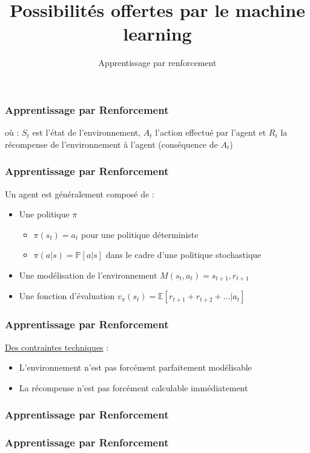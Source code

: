 \documentclass{formation}
\title{Possibilités offertes par le machine learning}
\subtitle{Apprentissage par renforcement}
\begin{document}
\maketitle

\begin{frame}
  \frametitle{Apprentissage par Renforcement}
  où :
  \newline
  $S_t$ est l'état de l'environnement,
  \newline
  $A_t$ l'action effectué par l'agent et
  \newline
  $R_t$ la récompense de l'environnement à l'agent (conséquence de $A_t$)
\end{frame}

\begin{frame}
  \frametitle{Apprentissage par Renforcement}
  Un agent est généralement composé de :
  \begin{itemize}
  \item Une politique \textbf{$\pi$} 
    \begin{itemize}
    \item $\pi(s_t) = a_t$ pour une politique déterministe
    \item $\pi(a | s) = \mathbb{P}[a|s]$ dans le cadre d'une politique stochastique
    \end{itemize}
  \item Une modélisation de l'environnement \textbf{$M(s_t,a_t)=s_{t+1},r_{t+1}$}
  \item Une fonction d'évaluation \textbf{$v_{\pi}(s_t)$}$ = \mathbb{E}[r_{t+1}+r_{t+2}+...|a_t]$
  \end{itemize}
\end{frame}

\begin{frame}
  \frametitle{Apprentissage par Renforcement}
  \underline{Des contraintes techniques} :
  \begin{itemize}
  \item L'environnement n'est pas forcément parfaitement modélisable
  \item La récompense n'est pas forcément calculable immédiatement
  \end{itemize}
\end{frame}

\begin{frame}
  \frametitle{Apprentissage par Renforcement}
\end{frame}

\begin{frame}
  \frametitle{Apprentissage par Renforcement}
  \begin{center}
  \end{center}
\end{frame}
\end{document}
